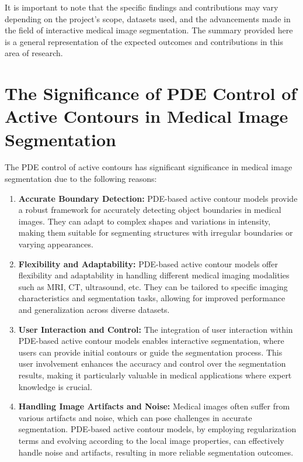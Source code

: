 \documentclass[]{report}
\begin{document}
It is important to note that the specific findings and contributions may vary depending on the project's scope, datasets used, and the advancements made in the field of interactive medical image segmentation. The summary provided here is a general representation of the expected outcomes and contributions in this area of research.

\section*{The Significance of PDE Control of Active Contours in Medical Image Segmentation}

The PDE control of active contours has significant significance in medical image segmentation due to the following reasons:

\begin{enumerate}
    \item \textbf{Accurate Boundary Detection:} PDE-based active contour models provide a robust framework for accurately detecting object boundaries in medical images. They can adapt to complex shapes and variations in intensity, making them suitable for segmenting structures with irregular boundaries or varying appearances.

    \item \textbf{Flexibility and Adaptability:} PDE-based active contour models offer flexibility and adaptability in handling different medical imaging modalities such as MRI, CT, ultrasound, etc. They can be tailored to specific imaging characteristics and segmentation tasks, allowing for improved performance and generalization across diverse datasets.

    \item \textbf{User Interaction and Control:} The integration of user interaction within PDE-based active contour models enables interactive segmentation, where users can provide initial contours or guide the segmentation process. This user involvement enhances the accuracy and control over the segmentation results, making it particularly valuable in medical applications where expert knowledge is crucial.

    \item \textbf{Handling Image Artifacts and Noise:} Medical images often suffer from various artifacts and noise, which can pose challenges in accurate segmentation. PDE-based active contour models, by employing regularization terms and evolving according to the local image properties, can effectively handle noise and artifacts, resulting in more reliable segmentation outcomes.


\end{enumerate}
\end{document}

